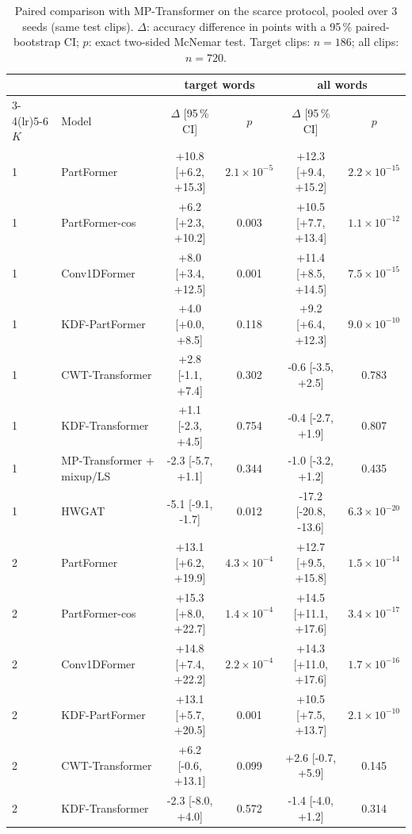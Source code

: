 \begin{table}[t]
\centering
\small
\caption{Paired comparison with MP-Transformer on the scarce protocol, pooled over 3 seeds (same test clips). $\Delta$: accuracy difference in points with a 95\,\% paired-bootstrap CI; $p$: exact two-sided McNemar test. Target clips: $n=186$; all clips: $n=720$.}
\label{tab:paired}
\footnotesize
\setlength{\tabcolsep}{3.5pt}
\begin{tabular}{llcccc}
\toprule
 & & \multicolumn{2}{c}{target words} & \multicolumn{2}{c}{all words} \\
\cmidrule(lr){3-4}\cmidrule(lr){5-6}
$K$ & Model & $\Delta$ [95\,\% CI] & $p$ & $\Delta$ [95\,\% CI] & $p$ \\
\midrule
1 & PartFormer & +10.8 [+6.2, +15.3] & $2.1\!\times\!10^{-5}$ & +12.3 [+9.4, +15.2] & $2.2\!\times\!10^{-15}$ \\
1 & PartFormer-cos & +6.2 [+2.3, +10.2] & 0.003 & +10.5 [+7.7, +13.4] & $1.1\!\times\!10^{-12}$ \\
1 & Conv1DFormer & +8.0 [+3.4, +12.5] & 0.001 & +11.4 [+8.5, +14.5] & $7.5\!\times\!10^{-15}$ \\
1 & KDF-PartFormer & +4.0 [+0.0, +8.5] & 0.118 & +9.2 [+6.4, +12.3] & $9.0\!\times\!10^{-10}$ \\
1 & CWT-Transformer & +2.8 [-1.1, +7.4] & 0.302 & -0.6 [-3.5, +2.5] & 0.783 \\
1 & KDF-Transformer & +1.1 [-2.3, +4.5] & 0.754 & -0.4 [-2.7, +1.9] & 0.807 \\
1 & MP-Transformer + mixup/LS & -2.3 [-5.7, +1.1] & 0.344 & -1.0 [-3.2, +1.2] & 0.435 \\
1 & HWGAT & -5.1 [-9.1, -1.7] & 0.012 & -17.2 [-20.8, -13.6] & $6.3\!\times\!10^{-20}$ \\
\midrule
2 & PartFormer & +13.1 [+6.2, +19.9] & $4.3\!\times\!10^{-4}$ & +12.7 [+9.5, +15.8] & $1.5\!\times\!10^{-14}$ \\
2 & PartFormer-cos & +15.3 [+8.0, +22.7] & $1.4\!\times\!10^{-4}$ & +14.5 [+11.1, +17.6] & $3.4\!\times\!10^{-17}$ \\
2 & Conv1DFormer & +14.8 [+7.4, +22.2] & $2.2\!\times\!10^{-4}$ & +14.3 [+11.0, +17.6] & $1.7\!\times\!10^{-16}$ \\
2 & KDF-PartFormer & +13.1 [+5.7, +20.5] & 0.001 & +10.5 [+7.5, +13.7] & $2.1\!\times\!10^{-10}$ \\
2 & CWT-Transformer & +6.2 [-0.6, +13.1] & 0.099 & +2.6 [-0.7, +5.9] & 0.145 \\
2 & KDF-Transformer & -2.3 [-8.0, +4.0] & 0.572 & -1.4 [-4.0, +1.2] & 0.314 \\

\end{tabular}
\end{table}
